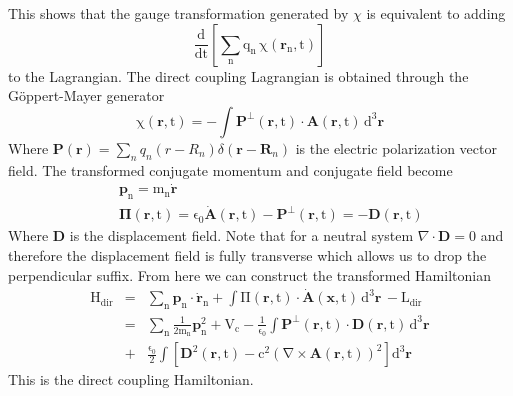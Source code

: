 This shows that the gauge transformation generated by $\chi$ is equivalent to adding 
\begin{equation}
\mathrm{\frac{d}{dt}\left[\sum_n q_n\,\chi(\mathbf{r}_n,t)\right]}
\end{equation}
to the Lagrangian.  The direct coupling Lagrangian is obtained through the G\"{o}ppert-Mayer generator
\begin{equation}
\mathrm{\chi(\mathbf{r},t)=-\int \mathbf{P}^{\perp}(\mathbf{r},t)\cdot\mathbf{A}(\mathbf{r},t)\,d^3\mathbf{r}}
\end{equation}
Where $\mathbf{P}(\mathbf{r})=\sum_n q_n\left(r-R_n\right)\delta(\mathbf{r}-\mathbf{R}_n)$ is the electric polarization vector field.  The transformed conjugate momentum and conjugate field become
\begin{eqnarray}
&&\mathrm{\mathbf{p}_n=m_n\dot{\mathbf{r}}} \\
&&\mathrm{\mathbf{\Pi}(\mathbf{r},t)=\epsilon_0 \dot{\mathbf{A}}(\mathbf{r},t)-\mathbf{P}^{\perp}(\mathbf{r},t)=-\mathbf{D}(\mathbf{r},t)}
\end{eqnarray}
Where $\mathbf{D}$ is the displacement field.  Note that for a neutral system $\nabla\cdot\mathbf{D}=0$ and therefore the displacement field is fully transverse which allows us to drop the perpendicular suffix. From here we can construct the transformed Hamiltonian 
\begin{eqnarray}
\mathrm{H_{dir}}&=&\mathrm{\sum_n\mathbf{p}_n\cdot\dot{\mathbf{r}}_n+\int\Pi(\mathbf{r},t)\cdot\dot{\mathbf{A}}(\mathbf{x},t)\,d^3\mathbf{r}\,-L_{dir}} \nonumber \\
&=&\mathrm{\sum_n \frac{1}{2m_n}\mathbf{p}^2_n+V_{c}-\frac{1}{\epsilon_0}\int \mathbf{P}^{\perp}(\mathbf{r},t)\cdot\mathbf{D}(\mathbf{r},t)\,d^3\mathbf{r}}\nonumber \\
&+&\mathrm{\frac{\epsilon_0}{2}\int\left[\mathbf{D}^2(\mathbf{r},t)-c^2\left(\nabla\times\mathbf{A}(\mathbf{r},t)\right)^2\right]d^3\mathbf{r}}
\label{minimalhamiltonian1}
\end{eqnarray} 
This is the direct coupling Hamiltonian. 
